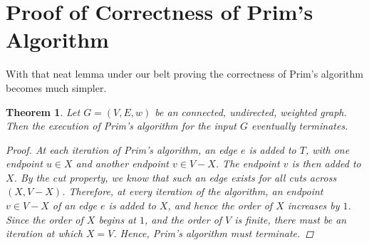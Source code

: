 \documentclass[a4paper,11pt]{report}
\theoremstyle{plain}
\newtheorem{thm}{Theorem}[section]
\theoremstyle{definition}
\begin{document}
\section{Proof of Correctness of Prim's Algorithm}

With that neat lemma under our belt proving the correctness of Prim's algorithm
becomes much simpler.

\begin{thm}
Let $G = (V, E, w)$ be an connected, undirected, weighted graph. Then the
execution of Prim's algorithm for the input $G$ eventually terminates.

\begin{proof}
At each iteration of Prim's algorithm, an edge $e$ is added to $T$, with one
endpoint $u \in X$ and another endpoint $v \in V - X$. The endpoint $v$ is
then added to $X$. By the cut property, we know that such an edge exists for
all cuts across $(X, V - X)$. Therefore, at every iteration of the algorithm,
an endpoint $v \in V - X$ of an edge $e$ is added to $X$, and hence the order
of $X$ increases by $1$. Since the order of $X$ begins at $1$, and the order
of $V$ is finite, there must be an iteration at which $X = V$. Hence, Prim's
algorithm must terminate.
\end{proof}
\end{thm}
\end{document}
